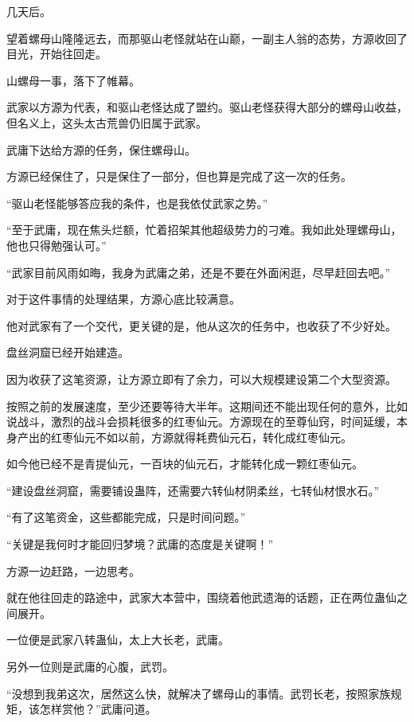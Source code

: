 
\begin{this_body}

几天后。

望着螺母山隆隆远去，而那驱山老怪就站在山巅，一副主人翁的态势，方源收回了目光，开始往回走。

山螺母一事，落下了帷幕。

武家以方源为代表，和驱山老怪达成了盟约。驱山老怪获得大部分的螺母山收益，但名义上，这头太古荒兽仍旧属于武家。

武庸下达给方源的任务，保住螺母山。

方源已经保住了，只是保住了一部分，但也算是完成了这一次的任务。

“驱山老怪能够答应我的条件，也是我依仗武家之势。”

“至于武庸，现在焦头烂额，忙着招架其他超级势力的刁难。我如此处理螺母山，他也只得勉强认可。”

“武家目前风雨如晦，我身为武庸之弟，还是不要在外面闲逛，尽早赶回去吧。”

对于这件事情的处理结果，方源心底比较满意。

他对武家有了一个交代，更关键的是，他从这次的任务中，也收获了不少好处。

盘丝洞窟已经开始建造。

因为收获了这笔资源，让方源立即有了余力，可以大规模建设第二个大型资源。

按照之前的发展速度，至少还要等待大半年。这期间还不能出现任何的意外，比如说战斗，激烈的战斗会损耗很多的红枣仙元。方源现在的至尊仙窍，时间延缓，本身产出的红枣仙元不如以前，方源就得耗费仙元石，转化成红枣仙元。

如今他已经不是青提仙元，一百块的仙元石，才能转化成一颗红枣仙元。

“建设盘丝洞窟，需要铺设蛊阵，还需要六转仙材阴柔丝，七转仙材恨水石。”

“有了这笔资金，这些都能完成，只是时间问题。”

“关键是我何时才能回归梦境？武庸的态度是关键啊！”

方源一边赶路，一边思考。

就在他往回走的路途中，武家大本营中，围绕着他武遗海的话题，正在两位蛊仙之间展开。

一位便是武家八转蛊仙，太上大长老，武庸。

另外一位则是武庸的心腹，武罚。

“没想到我弟这次，居然这么快，就解决了螺母山的事情。武罚长老，按照家族规矩，该怎样赏他？”武庸问道。


\end{this_body}
